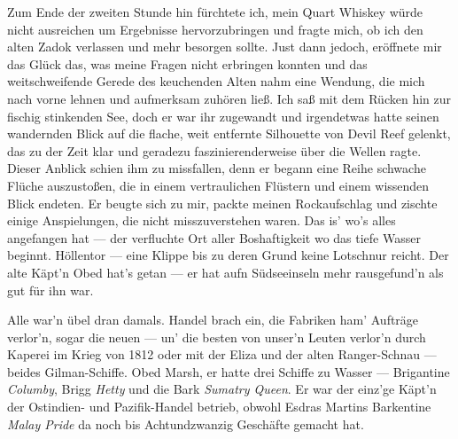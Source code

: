Zum Ende der zweiten Stunde hin fürchtete ich, mein Quart Whiskey würde nicht ausreichen um Ergebnisse hervorzubringen und fragte mich, ob ich den alten Zadok verlassen und mehr besorgen sollte. Just dann jedoch, eröffnete mir das Glück das, was meine Fragen nicht erbringen konnten und das weitschweifende Gerede des keuchenden Alten nahm eine Wendung, die mich nach vorne lehnen und aufmerksam zuhören ließ. Ich saß mit dem Rücken hin zur fischig stinkenden See, doch er war ihr zugewandt und irgendetwas hatte seinen wandernden Blick auf die flache, weit entfernte Silhouette von Devil Reef gelenkt, das zu der Zeit klar und geradezu faszinierenderweise über die Wellen ragte. Dieser Anblick schien ihm zu missfallen, denn er begann eine Reihe schwache Flüche auszustoßen, die in einem vertraulichen Flüstern und einem wissenden Blick endeten. Er beugte sich zu mir, packte meinen Rockaufschlag und zischte einige Anspielungen, die nicht misszuverstehen waren.
\glqq Das is' wo's alles angefangen hat --- der verfluchte Ort aller Boshaftigkeit wo das tiefe Wasser beginnt. Höllentor --- eine Klippe bis zu deren Grund keine Lotschnur reicht. Der alte Käpt'n Obed hat's getan --- er hat aufn Südseeinseln mehr rausgefund'n als gut für ihn war.

Alle war'n übel dran damals. Handel brach ein, die Fabriken ham' Aufträge verlor'n, sogar die neuen --- un' die besten von unser'n Leuten verlor'n durch Kaperei im Krieg von 1812 oder mit der Eliza und der alten Ranger-Schnau --- beides Gilman-Schiffe. Obed Marsh, er hatte drei Schiffe zu Wasser --- Brigantine \textit{Columby}, Brigg \textit{Hetty} und die Bark \textit{Sumatry Queen}. Er war der einz'ge Käpt'n der Ostindien- und Pazifik-Handel betrieb, obwohl Esdras Martins Barkentine \textit{Malay Pride} da noch bis Achtundzwanzig Geschäfte gemacht hat.
\grqq
